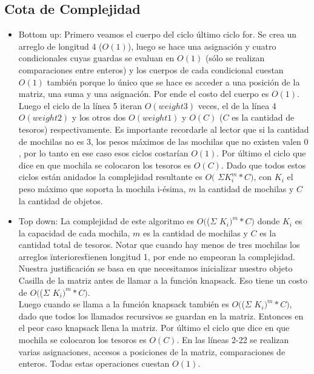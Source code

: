 \subsection{Cota de Complejidad}

\begin{itemize}
    \item Bottom up: Primero veamos el cuerpo del ciclo \'ultimo ciclo for. Se crea un arreglo de longitud 4 ($O(1)$), luego se hace una asignaci\'on y cuatro condicionales cuyas guardas se evaluan en $O(1)$ (s\'olo se realizan comparaciones entre enteros) y los cuerpos de cada condicional cuestan $O(1)$ tambi\'en porque lo \'unico que se hace es acceder a una posici\'on de la matriz, una suma y una asignaci\'on. Por ende el costo del cuerpo es $O(1)$. Luego el ciclo de la l\'inea 5 iteran $O(weight3)$ veces, el de la l\'inea 4 $O(weight2)$ y los otros dos $O(weight1)$ y $O(C)$ ($C$ es la cantidad de tesoros) respectivamente. Es importante recordarle al lector que si la cantidad de mochilas no es 3, los pesos m\'aximos de las mochilas que no existen valen $0$, por lo tanto en ese caso esos ciclos costar\'ian $O(1)$. Por \'ultimo el ciclo que dice en que mochila se colocaron los tesoros es $O(C)$. Dado que todos estos ciclos est\'an anidados la complejidad resultante es $O($ $\Sigma  K_{i}^{m}*C)$, con $K_i$ el peso m\'aximo que soporta la mochila i-\'esima, $m$ la cantidad de mochilas y $C$ la cantidad de objetos. 
    
    \item Top down:
    La complejidad de este algoritmo es $O($($\Sigma$ $K_{i})^m*C)$ donde $K_i$ es la capacidad de cada mochila, $m$ es la cantidad de mochilas y $C$ es la cantidad total de tesoros. Notar que cuando hay menos de tres mochilas los arreglos \"interiores\" tienen longitud 1, por ende no empeoran la complejidad.\\
    Nuestra justificaci\'on se basa en que necesitamos inicializar nuestro objeto Casilla de la matriz antes de llamar a la funci\'on knapsack. Eso tiene un costo de $O($($\Sigma$ $K_{i})^m*C)$. \\
    Luego cuando se llama a la funci\'on knapsack tambi\'en es $O($($\Sigma$ $K_{i})^m*C)$, dado que todos los llamados recursivos se guardan en la matriz. Entonces en el peor caso knapsack llena la matriz.
    Por \'ultimo el ciclo que dice en que mochila se colocaron los tesoros es $O(C)$. En las l\'ineas 2-22 se realizan varias asignaciones, accesos a posiciones de la matriz, comparaciones de enteros. Todas estas operaciones cuestan $O(1)$.
    
\end{itemize}


